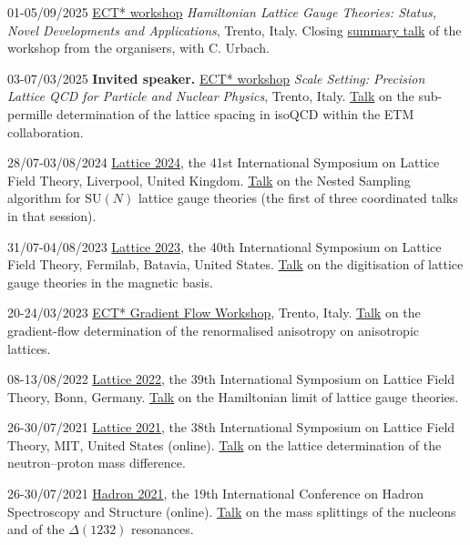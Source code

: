 \begin{cvlist}
\item[01-05/09/2025] \href{https://indico.ectstar.eu/event/242/}{ECT* workshop} \textit{Hamiltonian Lattice
Gauge Theories: Status, Novel Developments and Applications}, Trento, Italy. Closing
\href{https://indico.ectstar.eu/event/242/contributions/5858/}{summary talk} of the workshop from the
organisers, with C. Urbach.

\item[03-07/03/2025] \textbf{Invited speaker.} \href{https://indico.ectstar.eu/event/229/}{ECT*
workshop} \textit{Scale Setting: Precision Lattice QCD for Particle and Nuclear Physics}, Trento, Italy.
\href{https://indico.ectstar.eu/event/229/contributions/5308/}{Talk} on the sub-permille determination of the
lattice spacing in isoQCD within the ETM collaboration.

\item[28/07-03/08/2024] \href{https://conference.ippp.dur.ac.uk/event/1265/}{Lattice 2024}, the 41st
International Symposium on Lattice Field Theory, Liverpool, United Kingdom.
\href{https://conference.ippp.dur.ac.uk/event/1265/contributions/7618/}{Talk} on the Nested Sampling algorithm for
$\mathrm{SU}(N)$ lattice gauge theories (the first of three coordinated talks in that session).

\item[31/07-04/08/2023] \href{https://indico.fnal.gov/event/57249/}{Lattice 2023}, the 40th International
Symposium on Lattice Field Theory, Fermilab, Batavia, United States.
\href{https://indico.fnal.gov/event/57249/contributions/268337/}{Talk} on the digitisation of lattice gauge
theories in the magnetic basis.

\item[20-24/03/2023] \href{https://indico.ectstar.eu/event/164/}{ECT* Gradient Flow Workshop}, Trento, Italy.
\href{https://indico.ectstar.eu/event/164/contributions/3536/}{Talk} on the gradient-flow determination of the
renormalised anisotropy on anisotropic lattices.

\item[08-13/08/2022] \href{https://indico.hiskp.uni-bonn.de/event/40/}{Lattice 2022}, the 39th International
Symposium on Lattice Field Theory, Bonn, Germany.
\href{https://indico.hiskp.uni-bonn.de/event/40/contributions/704/}{Talk} on the Hamiltonian limit of lattice
gauge theories.

\item[26-30/07/2021] \href{https://indico.cern.ch/event/1006302/}{Lattice 2021}, the 38th International
Symposium on Lattice Field Theory, MIT, United States (online).
\href{https://indico.cern.ch/event/1006302/contributions/4373299/}{Talk} on the lattice determination of the
neutron--proton mass difference.

\item[26-30/07/2021] \href{https://indico.nucleares.unam.mx/event/1541/}{Hadron 2021}, the 19th International Conference on Hadron Spectroscopy and Structure
(online). \href{https://indico.nucleares.unam.mx/event/1541/session/28/contribution/226}{Talk} on the mass
splittings of the nucleons and of the $\Delta(1232)$ resonances.
\end{cvlist}


